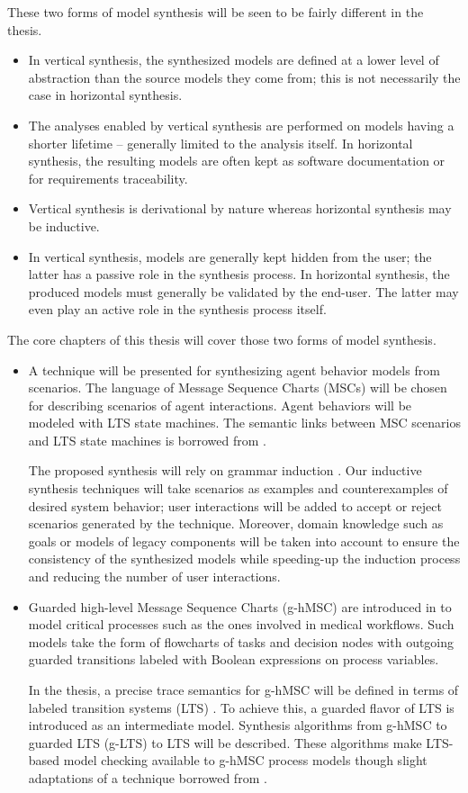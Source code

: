 These two forms of model synthesis will be seen to be fairly different in the thesis.
\begin{itemize}
\item In vertical synthesis, the synthesized models are defined at a lower level of abstraction than the source models they come from; this is not necessarily the case in horizontal synthesis.
\item The analyses enabled by vertical synthesis are performed on models having a shorter lifetime -- generally limited to the analysis itself. In horizontal synthesis, the resulting models are often kept as software documentation or for requirements traceability. 
\item Vertical synthesis is derivational by nature whereas horizontal synthesis may be inductive.
\item In vertical synthesis, models are generally kept hidden from the user; the latter has a passive role in the synthesis process. In horizontal synthesis, the produced models must generally be validated by the end-user. The latter may even play an active role in the synthesis process itself.
\end{itemize}

The core chapters of this thesis will cover those two forms of model synthesis.
\begin{itemize}
\item A technique will be presented for synthesizing agent behavior models from scenarios. The language of Message Sequence Charts (MSCs) will be chosen for describing scenarios of agent interactions. Agent behaviors will be modeled with LTS state machines. The semantic links between MSC scenarios and LTS state machines is borrowed from \cite{Uchitel:2003}.

The proposed synthesis will rely on grammar induction \cite{Oncina:1992,Lang:1998}. Our inductive synthesis techniques will take scenarios as examples and counterexamples of desired system behavior; user interactions will be added to accept or reject scenarios generated by the technique. Moreover, domain knowledge such as goals or models of legacy components will be taken into account to ensure the consistency of the synthesized models while speeding-up the induction process and reducing the number of user interactions.

\item Guarded high-level Message Sequence Charts (g-hMSC) are introduced in \cite{Damas:2010, Damas:2011} to model critical processes such as the ones involved in medical workflows. Such models take the form of flowcharts of tasks and decision nodes with outgoing guarded transitions labeled with Boolean expressions on process variables. 

In the thesis, a precise trace semantics for g-hMSC will be defined in terms of labeled transition systems (LTS) \cite{Keller:1976, Magee:1999}. To achieve this, a guarded flavor of LTS is introduced as an intermediate model. Synthesis algorithms from g-hMSC to guarded LTS (g-LTS) to LTS will be described. These algorithms make LTS-based model checking available to g-hMSC process models though slight adaptations of a technique borrowed from \cite{Giannakopoulou:2003}.
\end{itemize}
